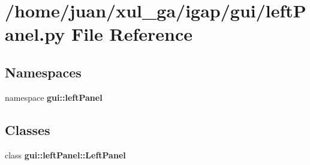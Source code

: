 \section{/home/juan/xul\_\-ga/igap/gui/leftPanel.py File Reference}
\label{leftPanel_8py}
\subsection*{Namespaces}
\begin{CompactItemize}
\item 
namespace {\bf gui::leftPanel}
\end{CompactItemize}
\subsection*{Classes}
\begin{CompactItemize}
\item 
class {\bf gui::leftPanel::LeftPanel}
\end{CompactItemize}
